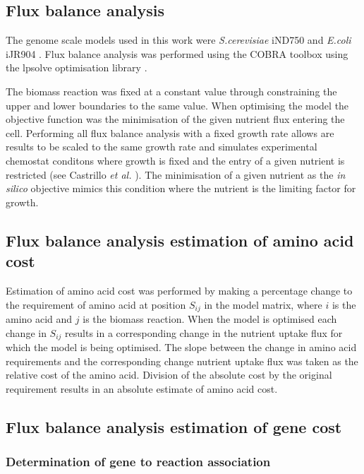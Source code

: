 \subsection{Flux balance analysis}

The genome scale models used in this work were \emph{S.cerevisiae} iND750 \cite{duarte2004a} and \emph{E.coli} iJR904 \cite{reed2003}. Flux balance analysis was performed using the COBRA toolbox \cite{becker2007} using the lpsolve optimisation library \cite{lpsolve}.

The biomass reaction was fixed at a constant value through constraining the upper and lower boundaries to the same value. When optimising the model the objective function was the minimisation of the given nutrient flux entering the cell. Performing all flux balance analysis with a fixed growth rate allows are results to be scaled to the same growth rate and simulates experimental chemostat conditons where growth is fixed and the entry of a given nutrient is restricted (see Castrillo \emph{et al.} \cite{castrillo2007}). The minimisation of a given nutrient as the \emph{in silico} objective mimics this condition where the nutrient is the limiting factor for growth.

\subsection{Flux balance analysis estimation of amino acid cost}

Estimation of amino acid cost was performed by making a percentage change to the requirement of amino acid at position $S_{ij}$ in the model matrix, where $i$ is the amino acid and $j$ is the biomass reaction. When the model is optimised each change in $S_{ij}$ results in a corresponding change in the nutrient uptake flux for which the model is being optimised. The slope between the change in amino acid requirements and the corresponding change nutrient uptake flux was taken as the relative cost of the amino acid. Division of the absolute cost by the original requirement results in an absolute estimate of amino acid cost.

\subsection{Flux balance analysis estimation of gene cost}

\subsubsection{Determination of gene to reaction association}

